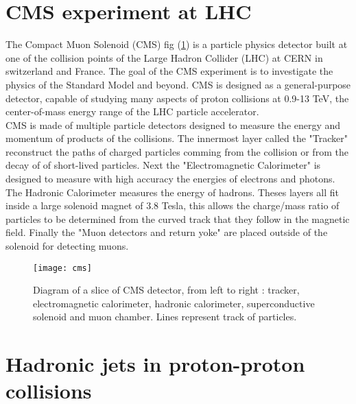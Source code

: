 \label{chap:premierchapitre}

\section{CMS experiment at LHC}

The Compact Muon Solenoid (CMS) fig (\ref{cms}) is a particle physics detector built at one of the collision points of the Large Hadron Collider
(LHC) at CERN in switzerland and France. The goal of the CMS experiment is to investigate the physics of the Standard Model and beyond.
CMS is designed as a general-purpose detector, capable of studying many aspects of proton collisions at 0.9-13 TeV, the
center-of-mass energy range of the LHC particle accelerator.\\
CMS is made of multiple particle detectors designed to measure the energy and momentum of products of the collisions.
The innermost layer called the "Tracker" reconstruct the paths of charged particles comming from the collision or from the
decay of of short-lived particles.
Next the "Electromagnetic Calorimeter" is designed to measure with high accuracy the energies of electrons and
photons.\\
The Hadronic Calorimeter measures the energy of hadrons.%
Theses layers all fit inside a large solenoid magnet of 3.8 Tesla, this allows the charge/mass ratio of particles to be
determined from the curved track that they follow in the magnetic field.
Finally the "Muon detectors and return yoke" are placed outside of the solenoid for detecting muons.

\begin{figure}[h!]
  \centering
  \texttt{[image: cms]}\\[1cm]
  \caption{Diagram of a slice of CMS detector, from left to right : tracker, electromagnetic calorimeter, hadronic
  calorimeter, superconductive solenoid and muon chamber. Lines represent track of particles.}
  \label{cms}
\end{figure}




\section{Hadronic jets in proton-proton collisions}

